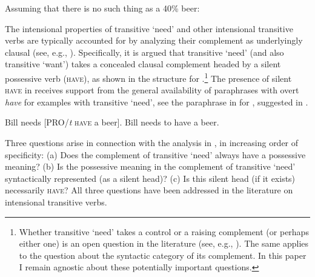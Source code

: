 \documentclass[output=paper]{langscibook}
\begin{document}
\ea Assuming that there is no such thing as a 40\% beer:\\
\label{need-non-referring}
\label{need-non-referring-infinitival}
\label{non-referring-non-intensional}
\z\z

\noindent The intensional properties of transitive `need' and other intensional transitive verbs are typically accounted for by analyzing their complement as underlyingly clausal (see, e.g., \citealt{denDikken.Larson.Ludlow2018,Harves2008}). Specifically, it is argued that transitive `need' (and also transitive `want') takes a concealed clausal complement headed by a silent possessive verb (\textsc{have}), as shown in the structure  for .\footnote{Whether transitive `need' takes a control or a raising complement (or perhaps either one) is an open question in the literature (see, e.g., \citealt{Schwarz2006,Harves2008}). The same applies to the question about the syntactic category of its complement. In this paper I remain agnostic about these potentially important questions.} The presence of silent \textsc{have} in  receives support from the general availability of paraphrases with overt \textit{have} for examples with transitive `need', see the paraphrase in  for , suggested in \citet[259]{Schwarz2006}.

\ea \label{have}
\ea Bill needs [PRO/\textit{t} \textsc{have} a beer].\label{need-have-structure}
\ex Bill needs to have a beer.\label{need-have-infinitival}
\z \z

\noindent Three questions arise in connection with the analysis in , in increasing order of specificity: (a) Does the complement of transitive `need' always have a possessive meaning? (b) Is the possessive meaning in the complement of transitive `need' syntactically represented (as a silent head)? (c) Is this silent head (if it exists) necessarily \textsc{have}? All three questions have been addressed in the literature on intensional transitive verbs.
\end{document}
